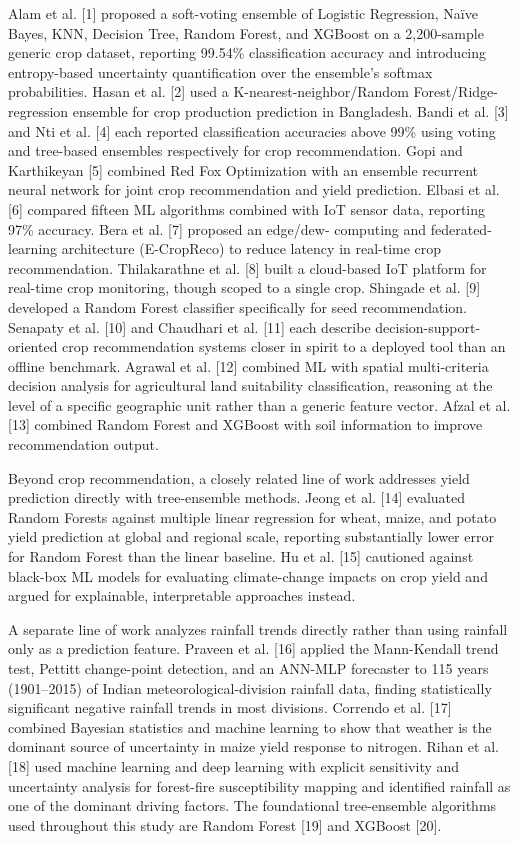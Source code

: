 \documentclass[12pt,a4paper,twocolumn]{article}
\begin{document}
Alam et al. [1] proposed a soft-voting ensemble of Logistic Regression, Na\"ive
Bayes, KNN, Decision Tree, Random Forest, and XGBoost on a 2,200-sample generic crop
dataset, reporting 99.54\% classification accuracy and introducing entropy-based
uncertainty quantification over the ensemble's softmax probabilities. Hasan et al.
[2] used a K-nearest-neighbor/Random Forest/Ridge-regression ensemble for crop
production prediction in Bangladesh. Bandi et al. [3] and Nti et al. [4] each
reported classification accuracies above 99\% using voting and tree-based ensembles
respectively for crop recommendation. Gopi and Karthikeyan [5] combined Red Fox
Optimization with an ensemble recurrent neural network for joint crop recommendation
and yield prediction. Elbasi et al. [6] compared fifteen ML algorithms combined with
IoT sensor data, reporting 97\% accuracy. Bera et al. [7] proposed an edge/dew-
computing and federated-learning architecture (E-CropReco) to reduce latency in
real-time crop recommendation. Thilakarathne et al. [8] built a cloud-based IoT
platform for real-time crop monitoring, though scoped to a single crop. Shingade et
al. [9] developed a Random Forest classifier specifically for seed recommendation.
Senapaty et al. [10] and Chaudhari et al. [11] each describe decision-support-
oriented crop recommendation systems closer in spirit to a deployed tool than an
offline benchmark. Agrawal et al. [12] combined ML with spatial multi-criteria
decision analysis for agricultural land suitability classification, reasoning at the
level of a specific geographic unit rather than a generic feature vector. Afzal et
al. [13] combined Random Forest and XGBoost with soil information to improve
recommendation output.

Beyond crop recommendation, a closely related line of work addresses yield
prediction directly with tree-ensemble methods. Jeong et al. [14] evaluated Random
Forests against multiple linear regression for wheat, maize, and potato yield
prediction at global and regional scale, reporting substantially lower error for
Random Forest than the linear baseline. Hu et al. [15] cautioned against black-box ML
models for evaluating climate-change impacts on crop yield and argued for
explainable, interpretable approaches instead.

A separate line of work analyzes rainfall trends directly rather than using rainfall
only as a prediction feature. Praveen et al. [16] applied the Mann-Kendall trend
test, Pettitt change-point detection, and an ANN-MLP forecaster to 115 years
(1901--2015) of Indian meteorological-division rainfall data, finding statistically
significant negative rainfall trends in most divisions. Correndo et al. [17] combined
Bayesian statistics and machine learning to show that weather is the dominant source
of uncertainty in maize yield response to nitrogen. Rihan et al. [18] used machine
learning and deep learning with explicit sensitivity and uncertainty analysis for
forest-fire susceptibility mapping and identified rainfall as one of the dominant
driving factors. The foundational tree-ensemble algorithms used throughout this study
are Random Forest [19] and XGBoost [20].
\end{document}
